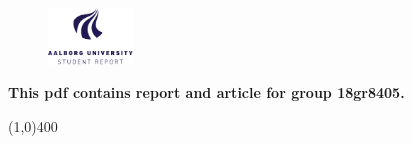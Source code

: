 \clearpage
\thispagestyle{empty}

\begin{figure}[H]
	\raggedleft
	\includegraphics[width=0.2\textwidth]{setup/aau_logo_en.pdf}
\end{figure} 

\vspace{5 cm}

\begin{center}	
	\begin{Huge}
		\textbf{This pdf contains report and article for group 18gr8405.}\\
		\vspace{3 mm}
	\end{Huge}
\end{center}
\vspace*{\fill}

\begin{center}
	\line(1,0){400}
\end{center}
